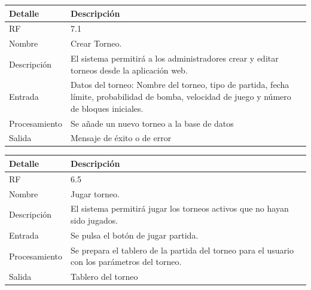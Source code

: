 \documentclass{article}
\begin{document}
\begin{table}[H]
  \begin{center}
    \begin{tabularx}{\linewidth}{|X|X|X|} %
      \hline
      \textbf{Detalle} & \textbf{Descripción}\\
      \hline
      RF & 7.1 \\
      \hline
      Nombre & Crear Torneo.\\
      \hline
      Descripción & El sistema permitirá a los administradores crear y editar torneos desde la aplicación web.\\
      \hline
      Entrada & Datos del torneo: Nombre del torneo, tipo de partida, fecha límite, probabilidad de bomba, velocidad de juego y número de bloques iniciales.\\
      \hline
      Procesamiento & Se añade un nuevo torneo a la base de datos\\
      \hline
      Salida & Mensaje de éxito o de error\\
      \hline
    \end{tabularx}
  \end{center}
\end{table}

\begin{table}[H]
  \begin{center}
    \begin{tabularx}{\linewidth}{|X|X|X|} %
      \hline
      \textbf{Detalle} & \textbf{Descripción}\\
      \hline
      RF & 6.5 \\
      \hline
      Nombre & Jugar torneo.\\
      \hline
      Descripción & El sistema permitirá jugar los torneos activos que no hayan sido jugados.\\
      \hline
      Entrada & Se pulsa el botón de jugar partida.\\
      \hline
      Procesamiento & Se prepara el tablero de la partida del torneo para el usuario con los parámetros del torneo.\\
      Salida & Tablero del torneo\\
      \hline
    \end{tabularx}
  \end{center}
\end{table}
\end{document}
